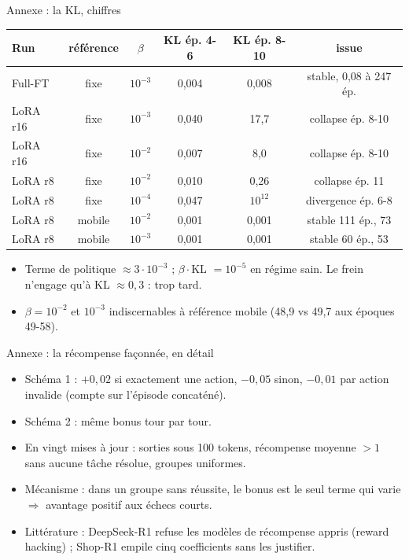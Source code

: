 \documentclass[aspectratio=169,11pt]{beamer}
\begin{document}
\begin{frame}{Annexe : la KL, chiffres}
\small
\begin{tabular}{lccccc}
\toprule
Run & référence & $\beta$ & KL ép. 4-6 & KL ép. 8-10 & issue \\
\midrule
Full-FT & fixe & $10^{-3}$ & 0,004 & 0,008 & stable, 0,08 à 247 ép. \\
LoRA r16 & fixe & $10^{-3}$ & 0,040 & 17,7 & collapse ép. 8-10 \\
LoRA r16 & fixe & $10^{-2}$ & 0,007 & 8,0 & collapse ép. 8-10 \\
LoRA r8 & fixe & $10^{-2}$ & 0,010 & 0,26 & collapse ép. 11 \\
LoRA r8 & fixe & $10^{-4}$ & 0,047 & $10^{12}$ & divergence ép. 6-8 \\
LoRA r8 & mobile & $10^{-2}$ & 0,001 & 0,001 & stable 111 ép., 73 \\
LoRA r8 & mobile & $10^{-3}$ & 0,001 & 0,001 & stable 60 ép., 53 \\
\bottomrule
\end{tabular}
\vspace{4pt}
\begin{itemize}
    \item Terme de politique $\approx 3\cdot10^{-3}$ ; $\beta\cdot$KL $= 10^{-5}$ en régime sain. Le frein n'engage qu'à KL $\approx 0{,}3$ : trop tard.
    \item $\beta=10^{-2}$ et $10^{-3}$ indiscernables à référence mobile (48,9 vs 49,7 aux époques 49-58).
\end{itemize}
\end{frame}

\begin{frame}{Annexe : la récompense façonnée, en détail}
\begin{itemize}
    \item Schéma 1 : $+0{,}02$ si exactement une action, $-0{,}05$ sinon, $-0{,}01$ par action invalide (compte sur l'épisode concaténé).
    \item Schéma 2 : même bonus tour par tour.
    \item En vingt mises à jour : sorties sous 100 tokens, récompense moyenne $> 1$ sans aucune tâche résolue, groupes uniformes.
    \item Mécanisme : dans un groupe sans réussite, le bonus est le seul terme qui varie $\Rightarrow$ avantage positif aux échecs courts.
    \item Littérature : DeepSeek-R1 refuse les modèles de récompense appris (reward hacking) ; Shop-R1 empile cinq coefficients sans les justifier.
\end{itemize}
\end{frame}
\end{document}
